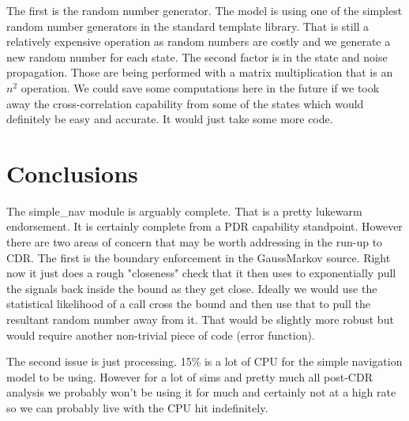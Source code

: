 \documentclass[]{BasiliskReportMemo}
\begin{document}
The first is the random number generator.  The model is using 
one of the simplest random number generators in the standard template library.  
That is still a relatively expensive operation as random numbers are costly and 
we generate a new random number for each state.  The second factor is in the 
state and noise propagation.  Those are being performed with a matrix 
multiplication that is an $n^2$ operation.  We could save some computations 
here in the future if we took away the cross-correlation capability from some 
of the states which would definitely be easy and accurate.  It would just take 
some more code.

\section{Conclusions}
The simple\_nav module is arguably complete.  That is a pretty lukewarm 
endorsement.  It is certainly complete from a PDR capability standpoint.  
However there are two areas of concern that may be worth addressing in the 
run-up to CDR.  The first is the boundary enforcement in the GaussMarkov 
source.  Right now it just does a rough "closeness" check that it then uses 
to exponentially pull the signals back inside the bound as they get close.  
Ideally we would use the statistical likelihood of a call cross the bound and 
then use that to pull the resultant random number away from it.  That would be 
slightly more robust but would require another non-trivial piece of code 
(error function).

The second issue is just processing.  15\% is a lot of CPU for the simple 
navigation model to be using.  However for a lot of sims and pretty much all 
post-CDR analysis we probably won't be using it for much and certainly not at 
a high rate so we can probably live with the CPU hit indefinitely.
\end{document}
